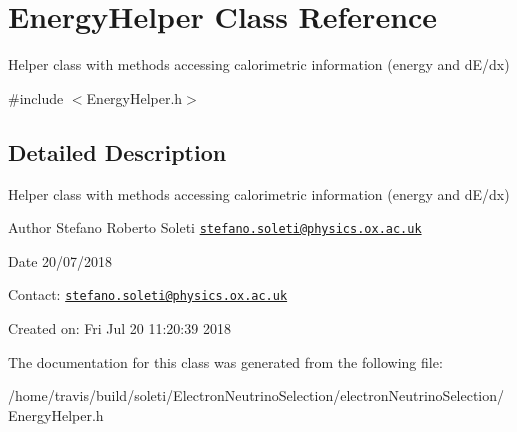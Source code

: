 \hypertarget{classEnergyHelper}{\section{Energy\-Helper Class Reference}
\label{classEnergyHelper}
}


Helper class with methods accessing calorimetric information (energy and d\-E/dx)  




{\ttfamily \#include $<$Energy\-Helper.\-h$>$}



\subsection{Detailed Description}
Helper class with methods accessing calorimetric information (energy and d\-E/dx) 

\begin{DoxyAuthor}{Author}
Stefano Roberto Soleti \href{mailto:stefano.soleti@physics.ox.ac.uk}{\tt stefano.\-soleti@physics.\-ox.\-ac.\-uk}
\end{DoxyAuthor}
\begin{DoxyDate}{Date}
20/07/2018
\end{DoxyDate}
Contact\-: \href{mailto:stefano.soleti@physics.ox.ac.uk}{\tt stefano.\-soleti@physics.\-ox.\-ac.\-uk}

Created on\-: Fri Jul 20 11\-:20\-:39 2018 

The documentation for this class was generated from the following file\-:\begin{DoxyCompactItemize}
\item 
/home/travis/build/soleti/\-Electron\-Neutrino\-Selection/electron\-Neutrino\-Selection/Energy\-Helper.\-h\end{DoxyCompactItemize}
